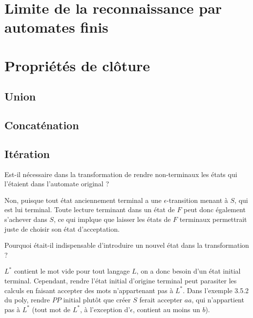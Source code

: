 \section{Limite de la reconnaissance par automates finis}

\section{Propriétés de clôture}
\label{cloture}
\subsection{Union}

\subsection{Concaténation}

\subsection{Itération}

\begin{exercice}
Est-il nécessaire dans la transformation de rendre non-terminaux les états qui l'étaient dans l'automate original ?
\end{exercice}

\begin{correction*}
Non, puisque tout état anciennement terminal a une $\epsilon$-transition menant à $S$, qui est lui terminal. Toute lecture terminant dans un état de $F$ peut donc également s'achever dans $S$, ce qui implque que laisser les états de $F$ terminaux permettrait juste de choisir son état d'acceptation.
\end{correction*}

\begin{exercice}
Pourquoi était-il indispensable d'introduire un nouvel état dans la transformation ?
\end{exercice}

\begin{correction*}
$L^*$ contient le mot vide pour tout langage $L$, on a donc besoin d'un état initial terminal. Cependant, rendre l'état initial d'origine terminal peut parasiter les calculs en faisant accepter des mots n'appartenant pas à $L^*$. Dans l'exemple 3.5.2 du poly, rendre $PP$ initial plutôt que créer $S$ ferait accepter $aa$, qui n'appartient pas à $L^*$ (tout mot de $L^*$, à l'exception d'$\epsilon$, contient au moins un $b$).   
\end{correction*}

